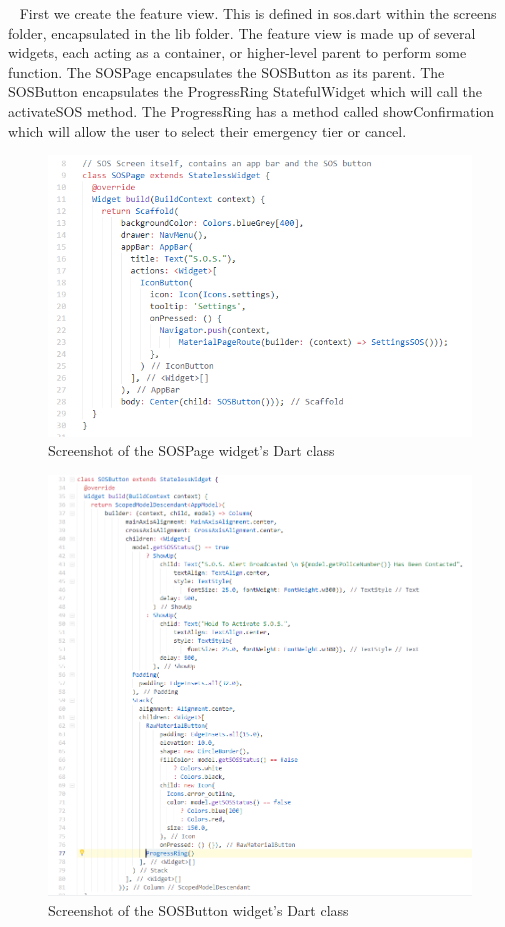 \documentclass[10pt, a4paper]{article}
\begin{document}
\par ~ First we create the feature view. This is defined in sos.dart within the screens folder, encapsulated in the lib folder. The feature view is made up of several widgets, each acting as a container, or higher-level parent to perform some function. The SOSPage encapsulates the SOSButton as its parent. The SOSButton encapsulates the ProgressRing StatefulWidget which will call the activateSOS method. The ProgressRing has a method called showConfirmation which will allow the user to select their emergency tier or cancel.

\begin{figure}[H]
\begin{center}
  \includegraphics[scale=1]{code-screenshots/sospage.PNG}
  \caption{Screenshot of the SOSPage widget's Dart class}
\end{center}
\end{figure}
\begin{figure}[H]
\begin{center}
  \includegraphics[scale=1]{code-screenshots/sosbutton.PNG}
  \caption{Screenshot of the SOSButton widget's Dart class}
\end{center}
\end{figure}
\end{document}

